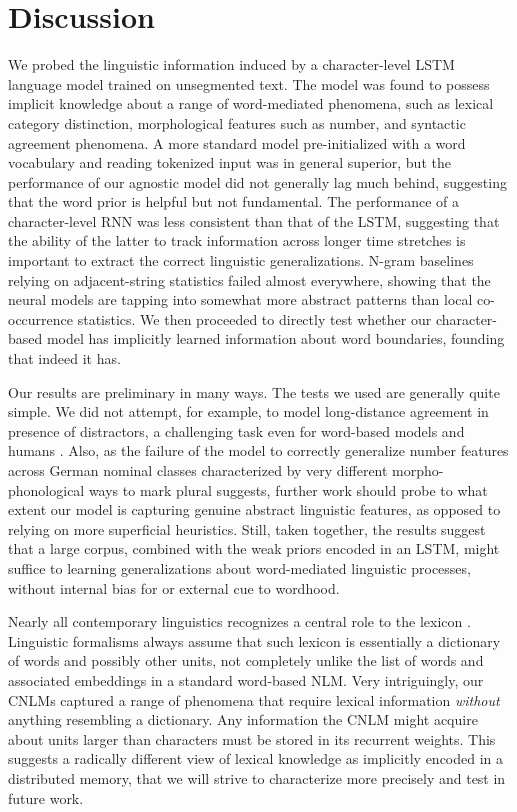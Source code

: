 \section{Discussion}
\label{sec:discussion}

We probed the linguistic information induced by a character-level LSTM
language model trained on unsegmented text. The model was found to
possess implicit knowledge about a range of word-mediated phenomena,
such as lexical category distinction, morphological features such as
number, and syntactic agreement phenomena. A more standard model
pre-initialized with a word vocabulary and reading tokenized input was
in general superior, but the performance of our agnostic model did not
generally lag much behind, suggesting that the word prior is helpful
but not fundamental. The performance of a character-level RNN was less
consistent than that of the LSTM, suggesting that the ability of the
latter to track information across longer time stretches is important
to extract the correct linguistic generalizations. N-gram baselines
relying on adjacent-string statistics failed almost everywhere,
showing that the neural models are tapping into somewhat more abstract
patterns than local co-occurrence statistics. We then proceeded to
directly test whether our character-based model has implicitly learned
information about word boundaries, founding that indeed it
has.

Our results are preliminary in many ways. The tests we used are
generally quite simple. We did not attempt, for example, to model
long-distance agreement in presence of distractors, a challenging task
even for word-based models and humans
\citep{Gulordava:etal:2018}. Also, as the failure of the model to
correctly generalize number features across German nominal classes
characterized by very different morpho-phonological ways to mark
plural suggests, further work should probe to what extent our model is
capturing genuine abstract linguistic features, as opposed to relying
on more superficial heuristics. Still, taken together, the results
suggest that a large corpus, combined with the weak priors encoded in
an LSTM, might suffice to learning generalizations about word-mediated
linguistic processes, without internal bias for or external cue to
wordhood.

Nearly all contemporary linguistics recognizes a central role to the
lexicon \cite[see, e.g.,][for very different
perspectives]{Sag:etal:2003,Goldberg:2005,Radford:2006,Bresnan:etal:2016,Jezek:2016}. Linguistic
formalisms always assume that such lexicon is essentially a dictionary
of words and possibly other units, not completely unlike the list of
words and associated embeddings in a standard word-based NLM. Very
intriguingly, our CNLMs captured a range of phenomena that require
lexical information \emph{without} anything resembling a
dictionary. Any information the CNLM might acquire about units larger
than characters must be stored in its recurrent weights. This suggests
a radically different view of lexical knowledge as implicitly encoded
in a distributed memory, that we will strive to characterize more
precisely and test in future work.


